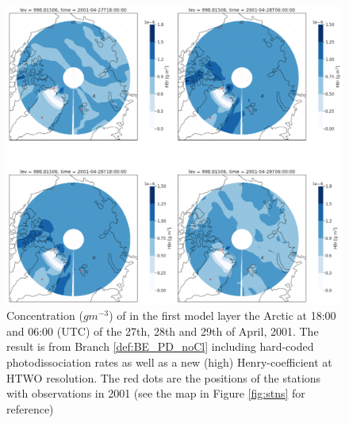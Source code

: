 \begin{figure}[h]
    \centering
    \includegraphics[width=\linewidth]{Chapter6_Results/images/Polar_StationComp_2001/HBr/polarHBr_HTWO_step3.png}
    \caption{Concentration ($g m^{-3}$) of  in the first model layer the Arctic at 18:00 and 06:00 (UTC) of the 27th, 28th and 29th of April, 2001. The result is from Branch \ref{def:BE_PD_noCl} including hard-coded photodissociation rates as well as a new (high) Henry-coefficient at HTWO resolution. The red dots are the positions of the stations with observations in 2001 (see the map in Figure \ref{fig:stns} for reference)}
    \label{fig:polarHBr_HTWO_step3}
\end{figure}